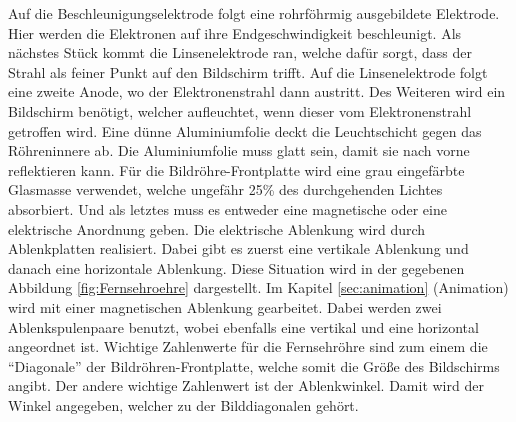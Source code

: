 Auf die Beschleunigungselektrode folgt eine rohrföhrmig ausgebildete Elektrode.
Hier werden die Elektronen auf ihre Endgeschwindigkeit beschleunigt.
Als nächstes Stück kommt die Linsenelektrode ran, welche dafür sorgt, dass der Strahl als feiner Punkt auf den Bildschirm trifft.
Auf die Linsenelektrode folgt eine zweite Anode, wo der Elektronenstrahl dann austritt.
Des Weiteren wird ein Bildschirm benötigt, welcher aufleuchtet, wenn dieser vom Elektronenstrahl getroffen wird.
Eine dünne Aluminiumfolie deckt die Leuchtschicht gegen das Röhreninnere ab.
Die Aluminiumfolie muss glatt sein, damit sie nach vorne reflektieren kann.
Für die Bildröhre-Frontplatte wird eine grau eingefärbte Glasmasse verwendet, welche ungefähr 25\% des durchgehenden Lichtes absorbiert.
Und als letztes muss es entweder eine magnetische oder eine elektrische Anordnung geben.
Die elektrische Ablenkung wird durch Ablenkplatten realisiert.
Dabei gibt es zuerst eine vertikale Ablenkung und danach eine horizontale Ablenkung.
Diese Situation wird in der gegebenen Abbildung \ref{fig:Fernsehroehre} dargestellt.
Im Kapitel \ref{sec:animation} (Animation) wird mit einer magnetischen Ablenkung gearbeitet.
Dabei werden zwei Ablenkspulenpaare benutzt, wobei ebenfalls eine vertikal und eine horizontal angeordnet ist.
Wichtige Zahlenwerte für die Fernsehröhre sind zum einem die "`Diagonale"' der Bildröhren-Frontplatte, welche somit die Größe des Bildschirms angibt.
Der andere wichtige Zahlenwert ist der Ablenkwinkel.
Damit wird der Winkel angegeben, welcher zu der Bilddiagonalen gehört.

